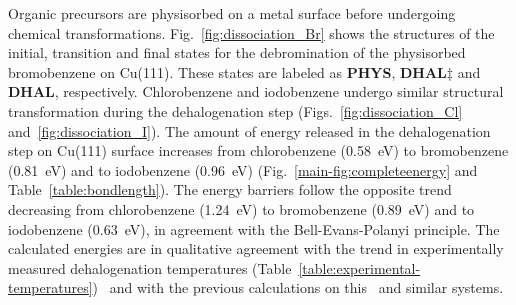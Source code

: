 \documentclass[aps,prl,reprint,amsmath,amssymb,floatfix,notitlepage]{revtex4-1}
\newcommand{\sinfo}{Supporting Information}
\begin{document}
Organic precursors are physisorbed on a metal surface before undergoing chemical transformations. 
%
Fig.~\ref{fig:dissociation_Br} shows the structures of the initial, transition and final states for the debromination of the physisorbed bromobenzene on Cu(111). These states are labeled as \textbf{PHYS}, \textbf{DHAL$\ddagger$} and \textbf{DHAL}, respectively. Chlorobenzene and iodobenzene undergo similar structural transformation during the dehalogenation step (Figs.~\ref{fig:dissociation_Cl} and~\ref{fig:dissociation_I}).
%
%
The amount of energy released in the dehalogenation step on Cu(111) surface increases from chlorobenzene (\SI{0.58}{\electronvolt}) to bromobenzene (\SI{0.81}{\electronvolt}) and to iodobenzene (\SI{0.96}{\electronvolt}) (Fig.~\ref{main-fig:completeenergy} and Table~\ref{table:bondlength}).
The energy barriers follow the opposite trend decreasing from chlorobenzene (\SI{1.24}{\electronvolt}) to bromobenzene (\SI{0.89}{\electronvolt}) and to iodobenzene (\SI{0.63}{\electronvolt}), in agreement with the Bell-Evans-Polanyi principle.
The calculated energies are in qualitative agreement with the trend in experimentally measured dehalogenation temperatures (Table~\ref{table:experimental-temperatures})~\cite{ullmann_52,ullmann_87,ullmann_67} and with the previous calculations on this~\cite{jacs2013} and similar systems.
\end{document}
